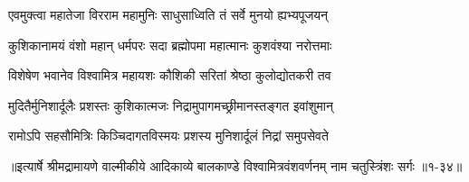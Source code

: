 \twolineshloka
{एवमुक्त्वा महातेजा विरराम महामुनिः}
{साधुसाध्विति तं सर्वे मुनयो ह्यभ्यपूजयन्} %

\twolineshloka
{कुशिकानामयं वंशो महान् धर्मपरः सदा}
{ब्रह्मोपमा महात्मानः कुशवंश्या नरोत्तमाः} %

\twolineshloka
{विशेषेण भवानेव विश्वामित्र महायशः}
{कौशिकी सरितां श्रेष्ठा कुलोद्योतकरी तव} %

\twolineshloka
{मुदितैर्मुनिशार्दूलैः प्रशस्तः कुशिकात्मजः}
{निद्रामुपागमच्छ्रीमानस्तङ्गत इवांशुमान्} %

\twolineshloka
{रामोऽपि सहसौमित्रिः किञ्चिदागतविस्मयः}
{प्रशस्य मुनिशार्दूलं निद्रां समुपसेवते} %


॥इत्यार्षे श्रीमद्रामायणे वाल्मीकीये आदिकाव्ये बालकाण्डे विश्वामित्रवंशवर्णनम् नाम चतुस्त्रिंशः सर्गः ॥१-३४॥
